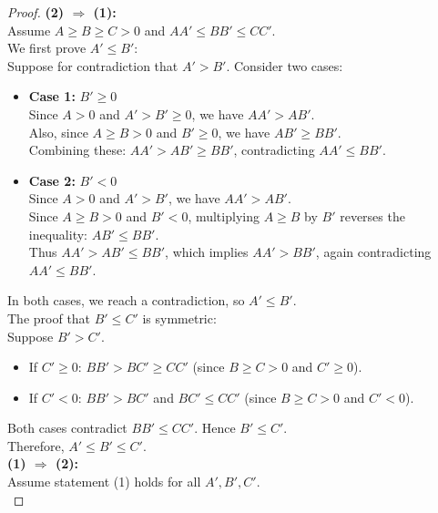 \documentclass{amsart}
\theoremstyle{plain}
\numberwithin{equation}{section}
\begin{document}
\begin{proof}
\noindent
\textbf{(2) \(\Rightarrow\) (1):} \\
Assume \(A \ge B \ge C > 0\) and \(A A' \le B B' \le C C'\). \\

We first prove \(A' \le B'\): \\
Suppose for contradiction that \(A' > B'\). Consider two cases:
\begin{itemize}
    \item \textbf{Case 1:} \(B' \ge 0\) \\
          Since \(A > 0\) and \(A' > B' \ge 0\), we have \(A A' > A B'\). \\
          Also, since \(A \ge B > 0\) and \(B' \ge 0\), we have \(A B' \ge B B'\). \\
          Combining these: \(A A' > A B' \ge B B'\), contradicting \(A A' \le B B'\).
    
    \item \textbf{Case 2:} \(B' < 0\) \\
          Since \(A > 0\) and \(A' > B'\), we have \(A A' > A B'\). \\
          Since \(A \ge B > 0\) and \(B' < 0\), multiplying \(A \ge B\) by \(B'\) reverses the inequality: \(A B' \le B B'\). \\
          Thus \(A A' > A B' \le B B'\), which implies \(A A' > B B'\), again contradicting \(A A' \le B B'\).
\end{itemize}
In both cases, we reach a contradiction, so \(A' \le B'\). \\

The proof that \(B' \le C'\) is symmetric: \\
Suppose \(B' > C'\).
\begin{itemize}
    \item If \(C' \ge 0\): \(B B' > B C' \ge C C'\) (since \(B \ge C > 0\) and \(C' \ge 0\)).
    \item If \(C' < 0\): \(B B' > B C'\) and \(B C' \le C C'\) (since \(B \ge C > 0\) and \(C' < 0\)).
\end{itemize}
Both cases contradict \(B B' \le C C'\). Hence \(B' \le C'\). \\

Therefore, \(A' \le B' \le C'\). \\

\noindent
\textbf{(1) \(\Rightarrow\) (2):} \\
Assume statement (1) holds for all \(A', B', C'\). \\


\end{proof}
\end{document}
